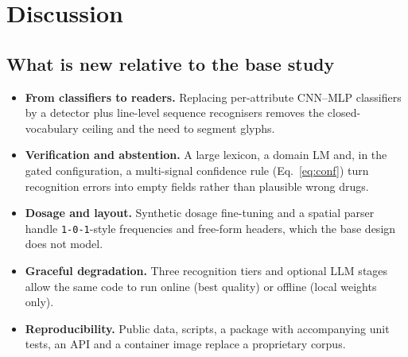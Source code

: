 \documentclass[journal]{IEEEtran}
\begin{document}
\section{Discussion}\label{sec:disc}

\subsection{What is new relative to the base study}
\begin{itemize}
  \item \textbf{From classifiers to readers.} Replacing per-attribute CNN--MLP classifiers by a detector plus line-level sequence recognisers removes the closed-vocabulary ceiling and the need to segment glyphs.
  \item \textbf{Verification and abstention.} A large lexicon, a domain LM and, in the gated configuration, a multi-signal confidence rule (Eq.~\ref{eq:conf}) turn recognition errors into empty fields rather than plausible wrong drugs.
  \item \textbf{Dosage and layout.} Synthetic dosage fine-tuning and a spatial parser handle \texttt{1-0-1}-style frequencies and free-form headers, which the base design does not model.
  \item \textbf{Graceful degradation.} Three recognition tiers and optional LLM stages allow the same code to run online (best quality) or offline (local weights only).
  \item \textbf{Reproducibility.} Public data, scripts, a package with accompanying unit tests, an API and a container image replace a proprietary corpus.
\end{itemize}
\end{document}
